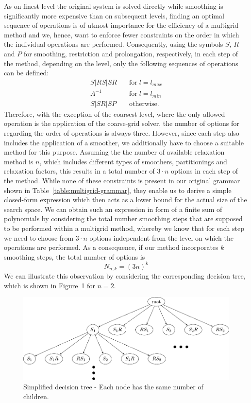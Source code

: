 As on finest level the original system is solved directly while smoothing is significantly more expensive than on subsequent levels, finding an optimal sequence of operations is of utmost importance for the efficiency of a multigrid method and we, hence, want to enforce fewer constraints on the order in which the individual operations are performed.
Consequently, using the symbols $S$, $R$ and $P$ for smoothing, restriction and prolongation, respectively, in each step of the method, depending on the level, only the following sequences of operations can be defined:
\begin{align*}
	S | RS | SR & \quad \text{for} \; l = l_{max} \\
	A^{-1} & \quad \text{for} \; l = l_{min} \\
	S | SR | SP & \quad \text{otherwise}.
\end{align*}
Therefore, with the exception of the coarsest level, where the only allowed operation is the application of the coarse-grid solver, the number of options for regarding the order of operations is always three.
However, since each step also includes the application of a smoother, we additionally have to choose a suitable method for this purpose.
Assuming the the number of available relaxation method is $n$, which includes different types of smoothers, partitionings and relaxation factors, this results in a total number of $3 \cdot n$ options in each step of the method. 
While none of these constraints is present in our original grammar shown in Table~\ref{table:multigrid-grammar}, they enable us to derive a simple closed-form expression which then acts as a lower bound for the actual size of the search space.
We can obtain such an expression in form of a finite sum of polynomials by considering the total number smoothing steps that are supposed to be performed within a multigrid method, whereby we know that for each step we need to choose from $3 \cdot n$ options independent from the level on which the operations are performed.
As a consequence, if our method incorporates $k$ smoothing steps, the total number of options is 
\begin{equation}
	N_{n,k} = (3 n)^k
	\label{eq:simplified-number-of-options}
\end{equation}
We can illustrate this observation by considering the corresponding decision tree, which is shown in Figure~\ref{fig:decision-tree} for $n = 2$.
\begin{figure}
	\centering
	\includegraphics[width=\textwidth]{figures/trees/decision_tree_annotated.pdf}
	\caption{Simplified decision tree - Each node has the same number of children.}
	\label{fig:decision-tree}
\end{figure}
